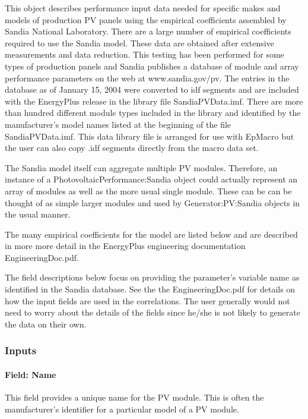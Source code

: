 This object describes performance input data needed for specific makes and models of production PV panels using the empirical coefficients assembled by Sandia National Laboratory. There are a large number of empirical coefficients required to use the Sandia model. These data are obtained after extensive measurements and data reduction. This testing has been performed for some types of production panels and Sandia publishes a database of module and array performance parameters on the web at www.sandia.gov/pv. The entries in the database as of January 15, 2004 were converted to idf segments and are included with the EnergyPlus release in the library file SandiaPVData.imf. There are more than hundred different module types included in the library and identified by the manufacturer's model names listed at the beginning of the file SandiaPVData.imf. This data library file is arranged for use with EpMacro but the user can also copy .idf segments directly from the macro data set.

The Sandia model itself can aggregate multiple PV modules. Therefore, an instance of a PhotovoltaicPerformance:Sandia object could actually represent an array of modules as well as the more usual single module. These can be can be thought of as simple larger modules and used by Generator:PV:Sandia objects in the usual manner.

The many empirical coefficients for the model are listed below and are described in more more detail in the EnergyPlus engineering documentation EngineeringDoc.pdf.

The field descriptions below focus on providing the parameter's variable name as identified in the Sandia database. See the the EngineeringDoc.pdf for details on how the input fields are used in the correlations. The user generally would not need to worry about the details of the fields since he/she is not likely to generate the data on their own.

\subsubsection{Inputs}\label{inputs-22}

\paragraph{Field: Name}\label{field-name-26}

This field provides a unique name for the PV module. This is often the manufacturer's identifier for a particular model of a PV module.

